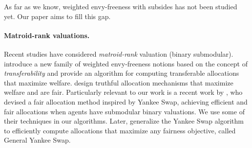  As far as we know, weighted envy-freeness with subsides has not been studied yet. Our paper aims to fill this gap.
 
 \paragraph{\textbf{Matroid-rank valuations.}}
 Recent studies have considered \emph{matroid-rank} valuation (binary submodular). \cite{montanari2024weighted} introduce a new family of weighted envy-freeness notions based on the concept of \emph{transferability} and provide an algorithm for computing transferable allocations that maximize welfare. \cite{babaioff2021fair} design truthful allocation mechanisms that maximize welfare and are fair. Particularly relevant to our work is a recent work by \cite{viswanathan2022yankee}, who devised a fair allocation method inspired by Yankee Swap, achieving efficient and fair allocations when agents have submodular binary valuations. We use some of their techniques in our algorithms. Later, \cite{viswanathan2023general} generalize the Yankee Swap algorithm to efficiently compute allocations that maximize any fairness objective, called General Yankee Swap.